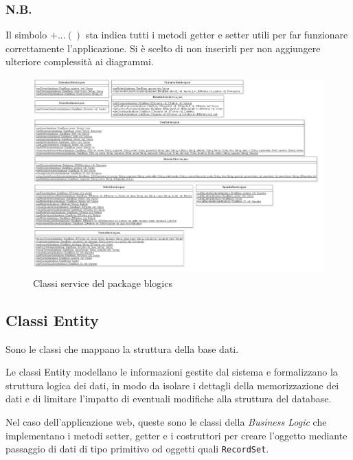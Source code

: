 	\subsubsection*{N.B.}
	Il simbolo $+...()$ sta indica tutti i metodi getter e setter utili per far funzionare correttamente l'applicazione. Si è scelto di non inserirli per non aggiungere ulteriore complessità ai diagrammi.
	
	\clearpage
	
	\begin{figure}[h]
		\centering
		\includegraphics[width=1\textwidth]
		{immagini/c-service-blogics}
		
		\caption{Classi service del package blogics}
	\end{figure}
	
	\clearpage
	
	\subsection{Classi Entity}
	Sono le classi che mappano la struttura della base dati.
	
	Le classi Entity modellano le informazioni gestite dal sistema e formalizzano la struttura logica dei dati, in modo da isolare i dettagli della memorizzazione dei dati e di limitare l'impatto di eventuali modifiche alla struttura del database.
	
	Nel caso dell'applicazione web, queste sono le classi della \emph{Business Logic} che implementano i metodi setter, getter e i costruttori per creare l'oggetto mediante passaggio di dati di tipo primitivo od oggetti quali \texttt{RecordSet}.
	
